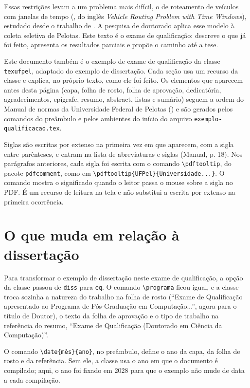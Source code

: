 \documentclass[eq,capa]{texufpel}
\begin{document}
Essas restrições levam a um problema mais difícil, o de roteamento de veículos
com janelas de tempo (, do inglês \textit{Vehicle Routing Problem with Time Windows}),
estudado desde o trabalho de \citet{Solomon:1987:AVR}. A pesquisa de doutorado
aplica esse modelo à coleta seletiva de Pelotas. Este texto é o exame de
qualificação: descreve o que já foi feito, apresenta os resultados parciais e
propõe o caminho até a tese.

Este documento também é o exemplo de exame de qualificação da classe
\texttt{texufpel}, adaptado do exemplo de dissertação. Cada seção usa um
recurso da classe e explica, no próprio texto, como ele foi feito. Os
elementos que aparecem antes desta página (capa, folha de rosto, folha de
aprovação, dedicatória, agradecimentos, epígrafe, resumo, abstract, listas e
sumário) seguem a ordem do Manual de normas da Universidade Federal de Pelotas
() e são gerados pelos
comandos do preâmbulo e pelos ambientes do início do arquivo
\texttt{exemplo-qualificacao.tex}.

Siglas são escritas por extenso na primeira vez em que aparecem, com a sigla
entre parênteses, e entram na lista de abreviaturas e siglas (Manual, p. 18).
Nos parágrafos anteriores, cada sigla foi escrita com o comando
\verb|\pdftooltip|, do pacote \texttt{pdfcomment}, como em
\verb|\pdftooltip{UFPel}{Universidade...}|. O comando mostra o significado
quando o leitor passa o mouse sobre a sigla no PDF. É um recurso de leitura na tela e não substitui a escrita por extenso na primeira
ocorrência.

\section{O que muda em relação à dissertação}

Para transformar o exemplo de dissertação neste exame de qualificação, a opção
da classe passou de \texttt{diss} para \texttt{eq}. O comando
\verb|\programa| ficou igual, e a classe troca sozinha a natureza do
trabalho na folha de rosto (``Exame de Qualificação apresentado ao Programa de
Pós-Graduação em Computação...'', agora para o título de Doutor), o texto da
folha de aprovação e o tipo de trabalho na referência do resumo, ``Exame de
Qualificação (Doutorado em Ciência da Computação)''.

O comando \verb|\date{mês}{ano}|, no preâmbulo, define o ano da capa, da
folha de rosto e da referência. Sem ele, a classe usa o ano em que o
documento é compilado; aqui, o ano foi fixado em 2028 para que o exemplo não
mude de data a cada compilação.
\end{document}
